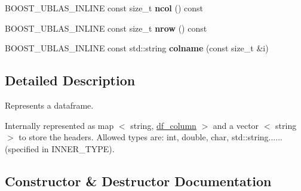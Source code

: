 \begin{DoxyCompactItemize}
\item 
B\+O\+O\+S\+T\+\_\+\+U\+B\+L\+A\+S\+\_\+\+I\+N\+L\+I\+NE const size\+\_\+t {\bfseries ncol} () const \hypertarget{classboost_1_1numeric_1_1ublas_1_1data__frame_adf7817e6cf0dcc7fa6d892a351b5c9a8}{}\label{classboost_1_1numeric_1_1ublas_1_1data__frame_adf7817e6cf0dcc7fa6d892a351b5c9a8}

\item 
B\+O\+O\+S\+T\+\_\+\+U\+B\+L\+A\+S\+\_\+\+I\+N\+L\+I\+NE const size\+\_\+t {\bfseries nrow} () const \hypertarget{classboost_1_1numeric_1_1ublas_1_1data__frame_a7f773294cbd41d890b5469e2a85abd32}{}\label{classboost_1_1numeric_1_1ublas_1_1data__frame_a7f773294cbd41d890b5469e2a85abd32}

\item 
B\+O\+O\+S\+T\+\_\+\+U\+B\+L\+A\+S\+\_\+\+I\+N\+L\+I\+NE const std\+::string {\bfseries colname} (const size\+\_\+t \&i)\hypertarget{classboost_1_1numeric_1_1ublas_1_1data__frame_abda7571a20f64b31d627d3fb2f7956fb}{}\label{classboost_1_1numeric_1_1ublas_1_1data__frame_abda7571a20f64b31d627d3fb2f7956fb}

\end{DoxyCompactItemize}


\subsection{Detailed Description}
Represents a dataframe. 

Internally represented as map $<$ string, \hyperlink{classboost_1_1numeric_1_1ublas_1_1df__column}{df\+\_\+column} $>$ and a vector $<$ string$>$ to store the headers. Allowed types are\+: int, double, char, std\+::string...... (specified in I\+N\+N\+E\+R\+\_\+\+T\+Y\+PE). 

\subsection{Constructor \& Destructor Documentation}
